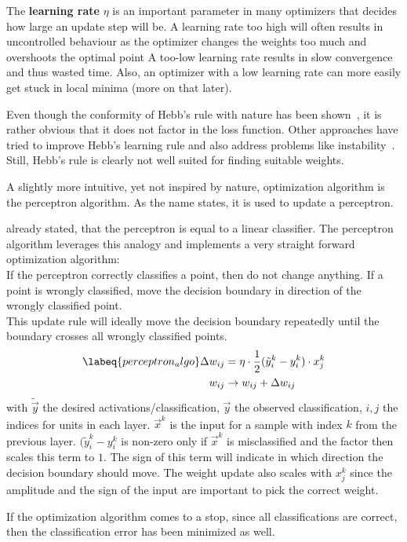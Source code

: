 The \textbf{learning rate} $\eta$ is an important parameter in many optimizers that decides how large an update step will be.
A learning rate too high will often results in uncontrolled behaviour as the optimizer changes the weights too much and overshoots the optimal point
A too-low learning rate results in slow convergence and thus wasted time.
Also, an optimizer with a low learning rate can more easily get stuck in local minima (more on that later).

Even though the conformity of Hebb's rule with nature has been shown~\cite{lomo}, it is rather obvious that it does not factor in the loss function.
Other approaches have tried to improve Hebb's learning rule and also address problems like instability~\cite{ojas_rule}.
Still, Hebb's rule is clearly not well suited for finding suitable weights.

A slightly more intuitive, yet not inspired by nature, optimization algorithm is the perceptron algorithm.
As the name states, it is used to update a perceptron.

 already stated, that the perceptron is equal to a linear classifier.
The perceptron algorithm leverages this analogy and implements a very straight forward optimization algorithm: \\
If the perceptron correctly classifies a point, then do not change anything. 
If a point is wrongly classified, move the decision boundary in direction of the wrongly classified point.\\
This update rule will ideally move the decision boundary repeatedly until the boundary crosses all wrongly classified points.
\begin{align}
    \labeq{perceptron_algo}
    \Delta w_{ij} & = \eta \cdot \frac{1}{2}(\tilde{y}^k_i - y^k_i) \cdot x^k_j \\
    w_{ij} & \rightarrow w_{ij} + \Delta w_{ij}
\end{align}
with $\tilde{\vec{y}}$ the desired activations/classification, $\vec{y}$ the observed classification, $i,j$ the indices for units in each layer.
$\vec{x}^k$ is the input for a sample with index $k$ from the previous layer.
$(\tilde{y}^k_i - y^k_i$ is non-zero only if $\vec{x}^k$ is misclassified and the factor then scales this term to $1$.
The sign of this term will indicate in which direction the decision boundary should move.
The weight update also scales with $x^k_j$ since the amplitude and the sign of the input are important to pick the correct weight.

If the optimization algorithm comes to a stop, since all classifications are correct, then the classification error has been minimized as well.

